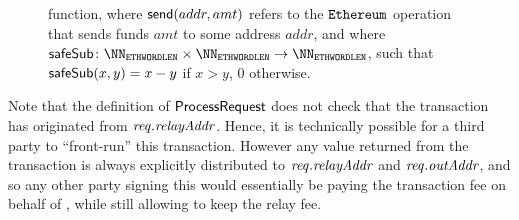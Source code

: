 \begin{figure}[H]
  \centering
  \caption{\relayexecprocessrequest{} function, where $\mathsf{send}(addr, amt)$ refers to the $\texttt{Ethereum}$ operation that sends funds $amt$ to some address $addr$, and where $\algostyle{safeSub} \colon \NN_{\ethWordLen} \times \NN_{\ethWordLen} \to \NN_{\ethWordLen}$, such that $\mathsf{safeSub}(x, y) = x - y$ if $x > y$, $0$ otherwise.}
  \label{relay-proof-permission:fig:relayexec-processrequest}
\end{figure}

Note that the definition of $\mathsf{ProcessRequest}$ does not check that the transaction has originated from $\mathit{req}.\mathit{relayAddr}$. Hence, it is technically possible for a third party to ``front-run'' this transaction. However any value returned from the transaction is always explicitly distributed to $\mathit{req}.\mathit{relayAddr}$ and $\mathit{req}.\mathit{outAddr}$, and so any other party signing this would essentially be paying the transaction fee on behalf of \relayEthAccount{}, while still allowing \relayEthAccount{} to keep the relay fee.

